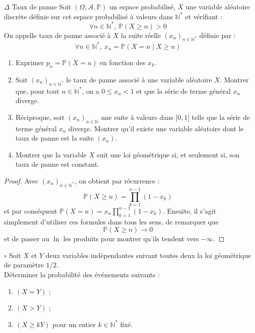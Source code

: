 \documentclass[french,a4paper]{article}
\renewcommand{\P}{\mathbb{P}}
\newcommand{\N}{\mathbb{N}}
\newcommand{\st}{^*}
\theoremstyle{plain}
\theoremstyle{definition}
\theoremstyle{remark}
\begin{document}
\begin{ex}{$\Delta$ Taux de panne}
	Soit $(\Omega,\mathcal{A},\P)$ un espace probabilisé, $X$ une variable aléatoire discrète définie sur cet espace probabilisé à valeurs dans $\N\st$ et vérifiant : $$\forall n\in\N\st,\ \P(X\geqslant n)>0$$ On appelle taux de panne associé à $X$ la suite réelle $(x_n)_{n\in\N\st}$ définie par : $$\forall n\in\N\st,\ x_n=\P(X=n\mid X\geqslant n)$$
	\begin{enumerate}
		\item Exprimer $p_n=\P(X=n)$ en fonction des $x_k$.
		\item Soit $(x_n)_{n\in\N\st}$ le taux de panne associé à une variable aléatoire $X$. Montrer que, pour tout $n\in\N\st$, on a $0\leqslant x_n<1$ et que la série de terme général $x_n$ diverge.
		\item Réciproque, soit $(x_n)_{n\in\N}$ une suite à valeurs dans $[0,1[$ telle que la série de terme général $x_n$ diverge. Montrer qu'il existe une variable aléatoire dont le taux de panne est la suite $(x_n)$.
		\item Montrer que la variable $X$ suit une loi géométrique si, et seulement si, son taux de panne est constant.
	\end{enumerate}
\end{ex}
\begin{proof}
	Avec $(x_n)_{n\in\N\st}$, on obtient par récurrence : $$\P(X\geqslant n)=\prod_{k=1}^{n-1}(1-x_k)$$ et par conséquent $\P(X=n)=x_n\prod_{k=1}^{n-1}(1-x_k)$. Ensuite, il s'agit simplement d'utiliser ces formules dans tous les sens, de remarquer que $$\P(X\geqslant n)\to 0$$ et de passer au $\ln$ les produits pour montrer qu'ils tendent vers $-\infty$.
\end{proof}

\begin{ex}{$\circ$}
	Soit $X$ et $Y$ deux variables indépendantes suivant toutes deux la loi géométrique de paramètre $1/2$. \\ Déterminer la probabilité des événements suivants :
	\begin{enumerate}
		\item $(X=Y)$ ;
		\item $(X>Y)$ ;
		\item $(X\geqslant kY)$ pour un entier $k\in\N\st$ fixé.
	\end{enumerate}
\end{ex}
\end{document}
